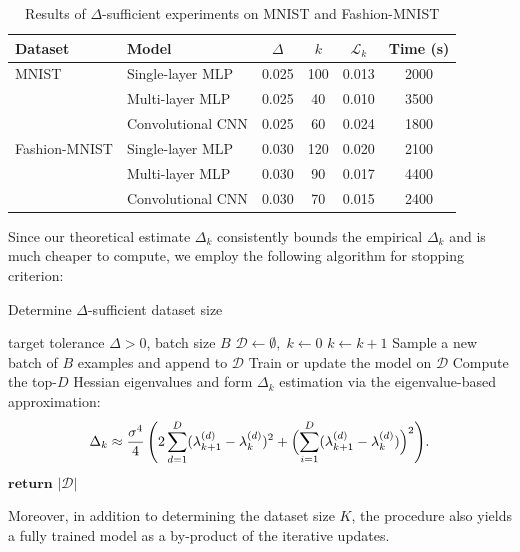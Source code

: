 \documentclass{article}
\begin{document}
\begin{table}[ht]
  \centering
  \caption{Results of $\Delta$-sufficient experiments on MNIST and Fashion-MNIST}\label{tab:results}
  \begin{tabular}{llcccc}
    \toprule
    Dataset       & Model             & $\Delta$ & $k$ & $\mathcal{L}_k$ & Time (s) \\
    \midrule
    MNIST         & Single-layer MLP  & 0.025    & 100 & 0.013           & 2000     \\
                  & Multi-layer MLP   & 0.025    & 40  & 0.010           & 3500     \\
                  & Convolutional CNN & 0.025    & 60  & 0.024           & 1800     \\
    \midrule
    Fashion-MNIST & Single-layer MLP  & 0.030    & 120 & 0.020           & 2100     \\
                  & Multi-layer MLP   & 0.030    & 90  & 0.017           & 4400     \\
                  & Convolutional CNN & 0.030    & 70  & 0.015           & 2400     \\
    \bottomrule
  \end{tabular}
\end{table}

Since our theoretical estimate $\Delta_k$ consistently bounds the
empirical $\Delta_k$ and is much cheaper to compute, we employ the following algorithm for stopping criterion:

\begin{algorithm}[H]
  \caption{Determine $\Delta$-sufficient dataset size}\label{alg:algo}
  \begin{algorithmic}[1]
    \Require target tolerance $\Delta>0$, batch size $B$
    \State $\mathcal{D}\gets \emptyset,\;k\gets 0$
    \Repeat
    \State $k\gets k+1$
    \State Sample a new batch of $B$ examples and append to $\mathcal{D}$
    \State Train or update the model on $\mathcal{D}$
    \State Compute the top-$D$ Hessian eigenvalues and form
    $\Delta_k$ estimation via the eigenvalue-based approximation:
    $$
      \Delta_k \approx
      \frac{\sigma^4}{4}\, \Biggl( 2 \sum_{d=1}^D (\lambda_{k+1}^{(d)} - \lambda_k^{(d)})^2
      + \Bigl( \sum_{i=1}^D (\lambda_{k+1}^{(d)} - \lambda_k^{(d)}) \Bigr)^2 \Biggr).
    $$
    \State $\textbf{return }|\mathcal{D}|$
  \end{algorithmic}
\end{algorithm}

Moreover, in addition to determining the dataset size $K$, the procedure also yields a fully trained model as a by‐product of the
iterative updates.
\end{document}

